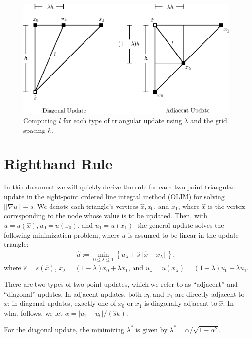 \documentclass{article}
\begin{document}
\begin{figure}[h]
  \centering
  \includegraphics{computing-l.eps}
  \caption{Computing $l$ for each type of triangular update using $\lambda$ and the grid spacing $h$.}
  \label{fig:computing-l}
\end{figure}

\section{Righthand Rule}

In this document we will quickly derive the rule for each two-point
triangular update in the eight-point ordered line integral method
(OLIM) for solving $||\nabla u|| = s$. We denote each triangle's
vertices $\hat{x}, x_0$, and $x_1$, where $\hat{x}$ is the vertex
corresponding to the node whose value is to be updated. Then, with
$\hat{u} = u(\hat{x}), u_0 = u(x_0)$, and $u_1 = u(x_1)$, the general
update solves the following minimization problem, where $u$ is assumed
to be linear in the update triangle:
\begin{align*}
  \hat{u} := \min_{0 \leq \lambda \leq 1} \left\{ u_\lambda + \hat{s} ||\hat{x} - x_\lambda||\right\},
\end{align*}
where $\hat{s} = s(\hat{x})$, $x_\lambda = (1 - \lambda) x_0 + \lambda x_1$, and
$u_\lambda = u(x_\lambda) = (1 - \lambda)u_0 + \lambda u_1$.

There are two types of two-point updates, which we refer to as
``adjacent'' and ``diagonal'' updates. In adjacent updates, both $x_0$
and $x_1$ are directly adjacent to $\hat{x}$; in diagonal updates,
exactly one of $x_0$ or $x_1$ is diagonally adjacent to $\hat{x}$. In
what follows, we let $\alpha = |u_1 - u_0|/(\hat{s} h)$.

\begin{lemma}\label{lemma:rhr-diagonal-update}
  For the diagonal update, the minimizing $\lambda^*$ is given by
  $\lambda^* = \alpha/\sqrt{1 - \alpha^2}$.
\end{lemma}
\end{document}
